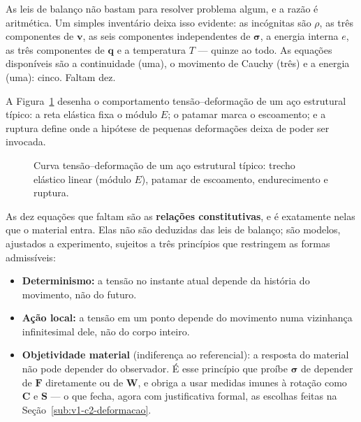 \documentclass[12pt,a4paper]{article}
\numberwithin{equation}{section}
\numberwithin{table}{section}
\numberwithin{figure}{section}
\begin{document}
As leis de balanço não bastam para resolver problema algum, e a razão é
aritmética. Um simples inventário deixa isso evidente: as incógnitas são
$\rho$, as três componentes de $\mathbf{v}$, as seis componentes independentes
de $\boldsymbol{\sigma}$, a energia interna $e$, as três componentes de
$\mathbf{q}$ e a temperatura $T$ --- quinze ao todo. As equações disponíveis
são a continuidade (uma), o movimento de Cauchy (três) e a energia (uma):
cinco. Faltam dez.

A Figura~\ref{fig:v1-c2-3} desenha o comportamento tensão--deformação de um
aço estrutural típico: a reta elástica fixa o módulo $E$; o patamar marca o
escoamento; e a ruptura define onde a hipótese de pequenas deformações deixa
de poder ser invocada.

\begin{figure}[H]
\centering
{}
\caption[Curva tensão--deformação característica de um aço.]{Curva
tensão--deformação de um aço estrutural típico: trecho elástico linear
(módulo $E$), patamar de escoamento, endurecimento e ruptura.}
\label{fig:v1-c2-3}
\end{figure}


As dez equações que faltam são as \textbf{relações constitutivas}, e é
exatamente nelas que o material entra. Elas não são deduzidas das leis de
balanço; são modelos, ajustados a experimento, sujeitos a três princípios que
restringem as formas admissíveis:

\begin{itemize}
	\item \textbf{Determinismo:} a tensão no instante atual depende da história
	do movimento, não do futuro.
	\item \textbf{Ação local:} a tensão em um ponto depende do movimento numa
	vizinhança infinitesimal dele, não do corpo inteiro.
	\item \textbf{Objetividade material} (indiferença ao referencial): a
	resposta do material não pode depender do observador. É esse princípio que
	proíbe $\boldsymbol{\sigma}$ de depender de $\mathbf{F}$ diretamente ou de
	$\mathbf{W}$, e obriga a usar medidas imunes à rotação como $\mathbf{C}$ e
	$\mathbf{S}$ --- o que fecha, agora com justificativa formal, as escolhas
	feitas na Seção~\ref{sub:v1-c2-deformacao}.
\end{itemize}
\end{document}
